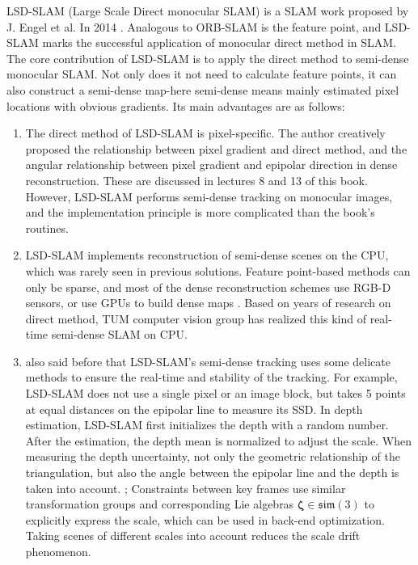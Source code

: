 LSD-SLAM (Large Scale Direct monocular SLAM) is a SLAM work proposed by J. Engel et al. In 2014 \textsuperscript{\cite{Engel2013, Engel2014}}. Analogous to ORB-SLAM is the feature point, and LSD-SLAM marks the successful application of monocular direct method in SLAM. The core contribution of LSD-SLAM is to apply the direct method to semi-dense monocular SLAM. Not only does it not need to calculate feature points, it can also construct a semi-dense map-here semi-dense means mainly estimated pixel locations with obvious gradients. Its main advantages are as follows:

\begin{enumerate}
\item The direct method of LSD-SLAM is pixel-specific. The author creatively proposed the relationship between pixel gradient and direct method, and the angular relationship between pixel gradient and epipolar direction in dense reconstruction. These are discussed in lectures 8 and 13 of this book. However, LSD-SLAM performs semi-dense tracking on monocular images, and the implementation principle is more complicated than the book's routines.
\item LSD-SLAM implements reconstruction of semi-dense scenes on the CPU, which was rarely seen in previous solutions. Feature point-based methods can only be sparse, and most of the dense reconstruction schemes use RGB-D sensors, or use GPUs to build dense maps \textsuperscript{\cite{Kerl2013}}. Based on years of research on direct method, TUM computer vision group has realized this kind of real-time semi-dense SLAM on CPU.
\item also said before that LSD-SLAM's semi-dense tracking uses some delicate methods to ensure the real-time and stability of the tracking. For example, LSD-SLAM does not use a single pixel or an image block, but takes 5 points at equal distances on the epipolar line to measure its SSD. In depth estimation, LSD-SLAM first initializes the depth with a random number. After the estimation, the depth mean is normalized to adjust the scale. When measuring the depth uncertainty, not only the geometric relationship of the triangulation, but also the angle between the epipolar line and the depth is taken into account. ; Constraints between key frames use similar transformation groups and corresponding Lie algebras $ \bm{\zeta} \in \mathfrak{sim} (3) $ to explicitly express the scale, which can be used in back-end optimization. Taking scenes of different scales into account reduces the scale drift phenomenon.
\end{enumerate}

